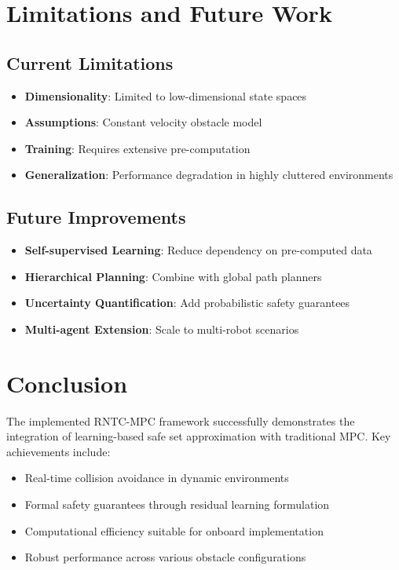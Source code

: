 \documentclass[12pt,a4paper]{article}
\begin{document}
\section{Limitations and Future Work}

\subsection{Current Limitations}
\begin{itemize}
    \item \textbf{Dimensionality}: Limited to low-dimensional state spaces
    \item \textbf{Assumptions}: Constant velocity obstacle model
    \item \textbf{Training}: Requires extensive pre-computation
    \item \textbf{Generalization}: Performance degradation in highly cluttered environments
\end{itemize}

\subsection{Future Improvements}
\begin{itemize}
    \item \textbf{Self-supervised Learning}: Reduce dependency on pre-computed data
    \item \textbf{Hierarchical Planning}: Combine with global path planners
    \item \textbf{Uncertainty Quantification}: Add probabilistic safety guarantees
    \item \textbf{Multi-agent Extension}: Scale to multi-robot scenarios
\end{itemize}

\section{Conclusion}

The implemented RNTC-MPC framework successfully demonstrates the integration of learning-based safe set approximation with traditional MPC. Key achievements include:

\begin{itemize}
    \item Real-time collision avoidance in dynamic environments
    \item Formal safety guarantees through residual learning formulation
    \item Computational efficiency suitable for onboard implementation
    \item Robust performance across various obstacle configurations
\end{itemize}
\end{document}
